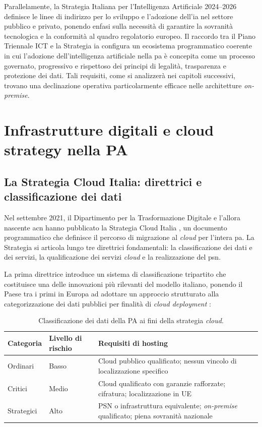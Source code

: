 Parallelamente, la Strategia Italiana per l'Intelligenza Artificiale 2024--2026 \parencite{StrategiaIA2024} definisce le linee di indirizzo per lo sviluppo e l'adozione dell'\gls{ia} nel settore pubblico e privato, ponendo enfasi sulla necessità di garantire la sovranità tecnologica e la conformità al quadro regolatorio europeo. Il raccordo tra il Piano Triennale ICT e la Strategia \gls{ia} configura un ecosistema programmatico coerente in cui l'adozione dell'intelligenza artificiale nella \gls{pa} è concepita come un processo governato, progressivo e rispettoso dei principi di legalità, trasparenza e protezione dei dati. Tali requisiti, come si analizzerà nei capitoli successivi, trovano una declinazione operativa particolarmente efficace nelle architetture \textit{on-premise}.


\section{Infrastrutture digitali e cloud strategy nella PA}
\label{sec:infrastrutture-cloud}

\subsection{La Strategia Cloud Italia: direttrici e classificazione dei dati}

Nel settembre 2021, il Dipartimento per la Trasformazione Digitale e l'allora nascente \gls{acn} hanno pubblicato la Strategia Cloud Italia \parencite{StrategiaCloudItalia}, un documento programmatico che definisce il percorso di migrazione al \textit{cloud} per l'intera \gls{pa}. La Strategia si articola lungo tre direttrici fondamentali: la classificazione dei dati e dei servizi, la qualificazione dei servizi \textit{cloud} e la realizzazione del \gls{psn}.

La prima direttrice introduce un sistema di classificazione tripartito che costituisce una delle innovazioni più rilevanti del modello italiano, ponendo il Paese tra i primi in Europa ad adottare un approccio strutturato alla categorizzazione dei dati pubblici per finalità di \textit{cloud deployment} \parencite{ClassificazioneDatiCloud}:

\begin{table}[H]
\centering
\caption{Classificazione dei dati della PA ai fini della strategia \textit{cloud}.}
\label{tab:classificazione-dati}
\begin{tabularx}{\textwidth}{l l X}
\toprule
\textbf{Categoria} & \textbf{Livello di rischio} & \textbf{Requisiti di hosting} \\
\midrule
Ordinari & Basso & Cloud pubblico qualificato; nessun vincolo di localizzazione specifico \\
Critici & Medio & Cloud qualificato con garanzie rafforzate; cifratura; localizzazione in UE \\
Strategici & Alto & PSN o infrastruttura equivalente; \textit{on-premise} qualificato; piena sovranità nazionale \\
\bottomrule
\end{tabularx}
\end{table}

